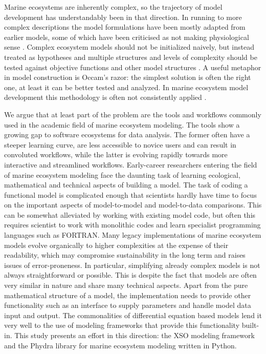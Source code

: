 \documentclass[journal abbreviation, manuscript]{copernicus}
\begin{document}
Marine ecosystems are inherently complex, so the trajectory of model development has understandably been in that direction. In running to more complex descriptions the model formulations have been mostly adapted from earlier models, some of which have been criticised as not making physiological sense \citep{Smith2014}.
Complex ecosystem models should not be initialized naively, but instead treated as hypotheses and multiple structures and levels of complexity should be tested against objective functions and other model structures \citep{Franks2009}. A useful metaphor in model construction is Occam's razor: the simplest solution is often the right one, at least it can be better tested and analyzed. In marine ecosystem model development this methodology is often not consistently applied \citep{Shimoda2016}.

We argue that at least part of the problem are the tools and workflows commonly used in the academic field of marine ecosystem modeling. The tools show a growing gap to software ecosystems for data analysis. The former often have a steeper learning curve, are less accessible to novice users and can result in convoluted workflows, while the latter is evolving rapidly towards more interactive and streamlined workflows.
Early-career researchers entering the field of marine ecosystem modeling face the daunting task of learning ecological, mathematical and technical aspects of building a model. The task of coding a functional model is complicated enough that scientists hardly have time to focus on the important aspects of model-to-model and model-to-data comparisons. This can be somewhat alleviated by working with existing model code, but often this requires scientist to work with monolithic codes and learn specialist programming languages such as FORTRAN.
Many legacy implementations of marine ecosystem models evolve organically to higher complexities at the expense of their readability, which may compromise sustainability in the long term and raises issues of error-proneness. In particular, simplifying already complex models is not always straightforward or possible.
This is despite the fact that models are often very similar in nature and share many technical aspects. Apart from the pure mathematical structure of a model, the implementation needs to provide other functionality such as an interface to supply parameters and handle model data input and output. 
The commonalities of differential equation based models lend it very well to the use of modeling frameworks that provide this functionality built-in. This study presents an effort in this direction: the XSO modeling framework and the Phydra library for marine ecosystem modeling written in Python.
\end{document}
